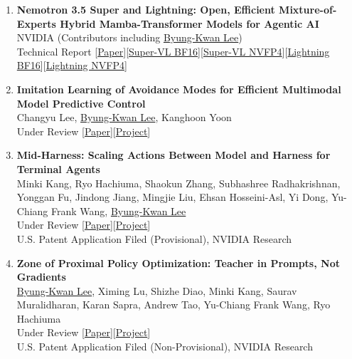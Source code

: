 \documentclass[a4paper,11pt]{article}
\begin{document}
\small{
\begin{enumerate}[leftmargin=2.2em, labelsep=0.6em, align=left, itemindent=0em, label={\color{accentDark}\textbf{\arabic*.}}]

\item \textbf{Nemotron 3.5 Super and Lightning: Open, Efficient Mixture-of-Experts Hybrid Mamba-Transformer Models for Agentic AI}
\\\vspace{1mm}NVIDIA (Contributors including \underline{Byung-Kwan Lee})
\\\vspace{2mm}Technical Report [\href{https://arxiv.org/abs/2610.38095}{Paper}][\href{https://huggingface.co/nvidia/NVIDIA-Nemotron-3.5-Super-VL-120B-A12B-BF16}{Super-VL BF16}][\href{https://huggingface.co/nvidia/NVIDIA-Nemotron-3.5-Super-VL-120B-A12B-NVFP4}{Super-VL NVFP4}][\href{https://huggingface.co/nvidia/NVIDIA-Nemotron-3.5-Lightning-30B-A3B-BF16}{Lightning BF16}][\href{https://huggingface.co/nvidia/NVIDIA-Nemotron-3.5-Lightning-30B-A3B-NVFP4}{Lightning NVFP4}]

\item \textbf{Imitation Learning of Avoidance Modes for Efficient Multimodal Model Predictive Control}
\\\vspace{1mm}Changyu Lee, \underline{Byung-Kwan Lee}, Kanghoon Yoon
\\\vspace{2mm}Under Review [\href{https://arxiv.org/abs/2610.16326}{Paper}][\href{https://sail-knu.github.io/Imitation-Learning-of-Avoidance-Modes-for-Computationally-Efficient-MM-MPC/}{Project}]

\item \textbf{Mid-Harness: Scaling Actions Between Model and Harness for Terminal Agents}
\\\vspace{1mm}Minki Kang, Ryo Hachiuma, Shaokun Zhang, Subhashree Radhakrishnan, Yonggan Fu, Jindong Jiang, Mingjie Liu, Ehsan Hosseini-Asl, Yi Dong, Yu-Chiang Frank Wang, \underline{Byung-Kwan Lee}
\\\vspace{2mm}Under Review [\href{https://arxiv.org/abs/2609.39982}{Paper}][\href{https://byungkwanlee.github.io/MidHarness-page/}{Project}]
\\\vspace{2mm}U.S. Patent Application Filed (Provisional), NVIDIA Research

\item \textbf{Zone of Proximal Policy Optimization: Teacher in Prompts, Not Gradients}
\\\vspace{1mm}\underline{Byung-Kwan Lee}, Ximing Lu, Shizhe Diao, Minki Kang, Saurav Muralidharan, Karan Sapra, Andrew Tao, Yu-Chiang Frank Wang, Ryo Hachiuma
\\\vspace{2mm}Under Review [\href{https://arxiv.org/abs/2606.18216}{Paper}][\href{https://byungkwanlee.github.io/ZPPO-page/}{Project}]
\\\vspace{2mm}U.S. Patent Application Filed (Non-Provisional), NVIDIA Research


\end{enumerate}}
\end{document}
